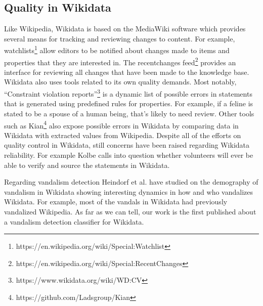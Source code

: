 \documentclass{sig-alternate-2013}
\begin{document}
\subsection{Quality in Wikidata}
Like Wikipedia, Wikidata is based on the MediaWiki software which provides several means for tracking and reviewing changes to content. For example, watchlists\footnote{https://en.wikipedia.org/wiki/Special:Watchlist} allow editors to be notified about changes made to items and properties that they are interested in. The recentchanges feed\footnote{https://en.wikipedia.org/wiki/Special:RecentChanges} provides an interface for reviewing all changes that have been made to the knowledge base. Wikidata also uses tools related to its own quality demands. Most notably, ``Constraint violation reports''\footnote{https://www.wikidata.org/wiki/WD:CV} is a dynamic list of possible errors in statements that is generated using predefined rules for properties.  For example, if a feline is stated to be a spouse of a human being, that's likely to need review. Other tools such as Kian\footnote{https://github.com/Ladsgroup/Kian} also expose possible errors in Wikidata by comparing data in Wikidata with extracted values from Wikipedia. Despite all of the efforts on quality control in Wikidata, still concerns have been raised regarding Wikidata reliability. For example Kolbe \cite{kolbe:whither} calls into question whether volunteers will ever be able to verify and source the statements in Wikidata.

Regarding vandalism detection Heindorf et al. have studied on the demography of vandalism in Wikidata \cite{heindorf:towards} showing interesting dynamics in how and who vandalizes Wikidata. For example, most of the vandals in Wikidata had previously vandalized Wikipedia. \cite{heindorf:towards} As far as we can tell, our work is the first published about a vandalism detection classifier for Wikidata.
\end{document}
